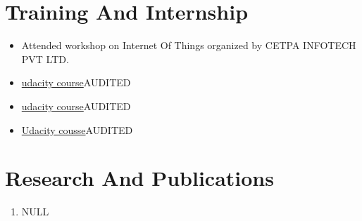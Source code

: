 \documentclass{article}
\begin{document}
\section{Training And Internship}
\begin{itemize}
\item {Attended workshop on Internet Of Things organized by CETPA INFOTECH PVT LTD.}
\item \href{https://classroom.udacity.com/courses/ud836}{udacity course}{AUDITED}
\item \href{https://classroom.udacity.com/courses/ud839}{udacity course}{AUDITED}
\item \href{https://classroom.udacity.com/courses/ud834}{Udacity cousse}{AUDITED}
\end{itemize}
\section{Research And Publications}
\begin{enumerate}
\item {NULL}
\end{enumerate}
\end{document}
